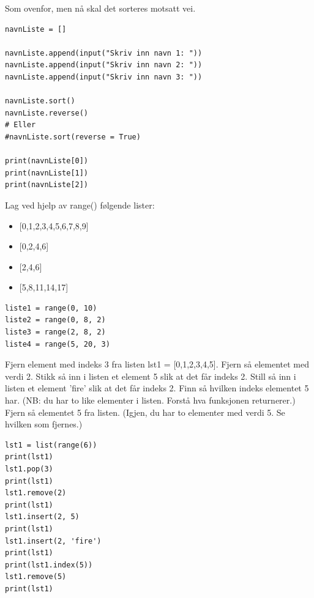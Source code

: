 \begin{exercise}
Som ovenfor, men nå skal det sorteres motsatt vei. 
\end{exercise}
\begin{solution}
\begin{lstlisting}
navnListe = []

navnListe.append(input("Skriv inn navn 1: "))
navnListe.append(input("Skriv inn navn 2: "))
navnListe.append(input("Skriv inn navn 3: "))

navnListe.sort()
navnListe.reverse()
# Eller
#navnListe.sort(reverse = True)

print(navnListe[0])
print(navnListe[1])
print(navnListe[2])
\end{lstlisting}
\end{solution}

\begin{exercise}
Lag ved hjelp av range() følgende lister:
\begin{itemize}
\item {[0,1,2,3,4,5,6,7,8,9]}
\item {[0,2,4,6]}
\item {[2,4,6]}
\item {[5,8,11,14,17]}
\end{itemize}
\end{exercise}
\begin{solution}
\begin{lstlisting}
liste1 = range(0, 10)
liste2 = range(0, 8, 2)
liste3 = range(2, 8, 2)
liste4 = range(5, 20, 3)
\end{lstlisting}
\end{solution}

\begin{exercise}
Fjern element med indeks 3 fra listen lst1 = [0,1,2,3,4,5]. Fjern så elementet med verdi 2. Stikk så inn i listen et element 5 slik at det får indeks 2. Still så inn i listen et element 'fire' slik at det får indeks 2. Finn så hvilken indeks elementet 5 har. (NB: du har to like elementer i listen. Forstå hva funksjonen returnerer.) Fjern så elementet 5 fra listen. (Igjen, du har to elementer med verdi 5. Se hvilken som fjernes.)
\end{exercise}
\begin{solution}
\begin{lstlisting}
lst1 = list(range(6))
print(lst1)
lst1.pop(3)
print(lst1)
lst1.remove(2)
print(lst1)
lst1.insert(2, 5)
print(lst1)
lst1.insert(2, 'fire')
print(lst1)
print(lst1.index(5))
lst1.remove(5)
print(lst1)
\end{lstlisting}
\end{solution}

